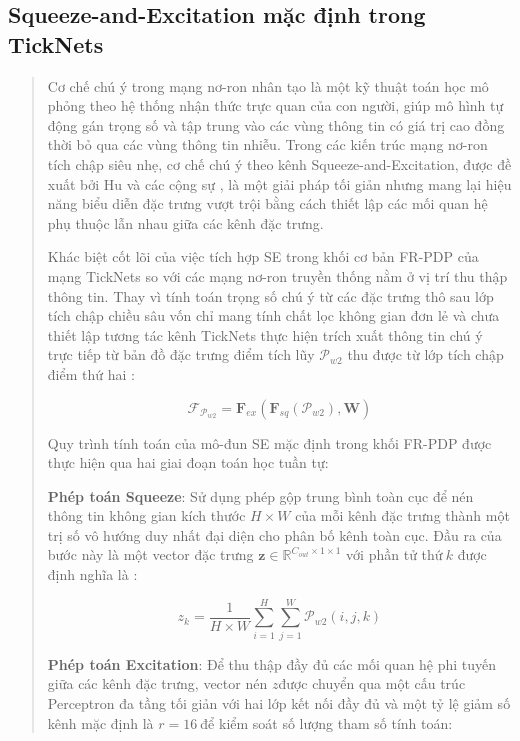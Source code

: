 \documentclass[
  12pt,
  a4paper,
]{report}
\begin{document}
\subsection{Squeeze-and-Excitation mặc định trong
TickNets}\label{squeeze-and-excitation-mux1eb7c-ux111ux1ecbnh-trong-ticknets}

\begin{quote}
Cơ chế chú ý trong mạng nơ-ron nhân tạo là một kỹ thuật toán học mô
phỏng theo hệ thống nhận thức trực quan của con người, giúp mô hình tự
động gán trọng số và tập trung vào các vùng thông tin có giá trị cao
đồng thời bỏ qua các vùng thông tin nhiễu. Trong các kiến trúc mạng
nơ-ron tích chập siêu nhẹ, cơ chế chú ý theo kênh
Squeeze-and-Excitation, được đề xuất bởi Hu và các cộng sự , là một giải
pháp tối giản nhưng mang lại hiệu năng biểu diễn đặc trưng vượt trội
bằng cách thiết lập các mối quan hệ phụ thuộc lẫn nhau giữa các kênh đặc
trưng.

Khác biệt cốt lõi của việc tích hợp SE trong khối cơ bản FR-PDP của mạng
TickNets so với các mạng nơ-ron truyền thống nằm ở vị trí thu thập thông
tin. Thay vì tính toán trọng số chú ý từ các đặc trưng thô sau lớp tích
chập chiều sâu vốn chỉ mang tính chất lọc không gian đơn lẻ và chưa
thiết lập tương tác kênh TickNets thực hiện trích xuất thông tin chú ý
trực tiếp từ bản đồ đặc trưng điểm tích lũy \(\mathcal{P}_{w2}\) thu
được từ lớp tích chập điểm thứ hai :

\[\mathcal{F}_{\mathcal{P}_{w2}} = \mathbf{F}_{ex}\left( \mathbf{F}_{sq}\left( \mathcal{P}_{w2} \right),\mathbf{W} \right)\]

Quy trình tính toán của mô-đun SE mặc định trong khối FR-PDP được thực
hiện qua hai giai đoạn toán học tuần tự:

\textbf{Phép toán Squeeze}: Sử dụng phép gộp trung bình toàn cục để nén
thông tin không gian kích thước \(H \times W\) của mỗi kênh đặc trưng
thành một trị số vô hướng duy nhất đại diện cho phân bố kênh toàn cục.
Đầu ra của bước này là một vector đặc trưng
\(\mathbf{z} \in \mathbb{R}^{C_{out} \times 1 \times 1}\) với phần tử
thứ\(\ k\) được định nghĩa là :

\[z_{k} = \frac{1}{H \times W}\sum_{i = 1}^{H}{\sum_{j = 1}^{W}\mathcal{P}_{w2}}(i,j,k)\]

\textbf{Phép toán Excitation}: Để thu thập đầy đủ các mối quan hệ phi
tuyến giữa các kênh đặc trưng, vector nén \(z\)được chuyển qua một cấu
trúc Perceptron đa tầng tối giản với hai lớp kết nối đầy đủ và một tỷ lệ
giảm số kênh mặc định là \(r = 16\ \)để kiểm soát số lượng tham số tính
toán:


\end{quote}
\end{document}
